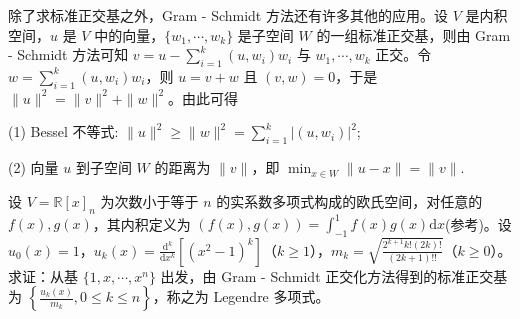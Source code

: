 \documentclass[../../main.tex]{subfiles}
\begin{document}
除了求标准正交基之外，Gram - Schmidt 方法还有许多其他的应用。设 $V$ 是内积空间，$u$ 是 $V$ 中的向量，$\{w_1,\cdots,w_k\}$ 是子空间 $W$ 的一组标准正交基，则由 Gram - Schmidt 方法可知 $v = u - \sum_{i = 1}^{k}(u,w_i)w_i$ 与 $w_1,\cdots,w_k$ 正交。令 $w = \sum_{i = 1}^{k}(u,w_i)w_i$，则 $u = v + w$ 且 $(v,w) = 0$，于是 $\|u\|^2 = \|v\|^2 + \|w\|^2$。由此可得

(1) Bessel 不等式: $\|u\|^2\geq\|w\|^2 = \sum_{i = 1}^{k}|(u,w_i)|^2$;

(2) 向量 $u$ 到子空间 $W$ 的距离为 $\|v\|$，即 $\min_{x\in W}\|u - x\| = \|v\|$. 

\begin{example}\label{example:例9.11}
设 $V = \mathbb{R}[x]_n$ 为次数小于等于 $n$ 的实系数多项式构成的欧氏空间，对任意的 $f(x),g(x)$，其内积定义为 $(f(x),g(x)) = \int_{-1}^{1}f(x)g(x)\mathrm{d}x$(参考)。设 $u_0(x)=1$，$u_k(x)=\frac{\mathrm{d}^k}{\mathrm{d}x^k}[(x^2 - 1)^k]$（$k\geq1$），$m_k = \sqrt{\frac{2^{k + 1}k!(2k)!}{(2k + 1)!!}}$（$k\geq0$）。求证：从基 $\{1,x,\cdots,x^n\}$ 出发，由 Gram - Schmidt 正交化方法得到的标准正交基为 $\left\{\frac{u_k(x)}{m_k},0\leq k\leq n\right\}$，称之为 Legendre 多项式。
\end{example}
\end{document}
